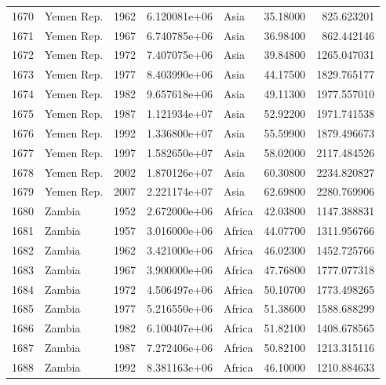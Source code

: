 \documentclass[
  letterpaper,
  DIV=11,
  numbers=noendperiod]{scrreprt}
\begin{document}
\begin{tabular}{llrrlrr}
1670 &                Yemen Rep. &  1962 &  6.120081e+06 &      Asia &  35.18000 &     825.623201 \\
1671 &                Yemen Rep. &  1967 &  6.740785e+06 &      Asia &  36.98400 &     862.442146 \\
1672 &                Yemen Rep. &  1972 &  7.407075e+06 &      Asia &  39.84800 &    1265.047031 \\
1673 &                Yemen Rep. &  1977 &  8.403990e+06 &      Asia &  44.17500 &    1829.765177 \\
1674 &                Yemen Rep. &  1982 &  9.657618e+06 &      Asia &  49.11300 &    1977.557010 \\
1675 &                Yemen Rep. &  1987 &  1.121934e+07 &      Asia &  52.92200 &    1971.741538 \\
1676 &                Yemen Rep. &  1992 &  1.336800e+07 &      Asia &  55.59900 &    1879.496673 \\
1677 &                Yemen Rep. &  1997 &  1.582650e+07 &      Asia &  58.02000 &    2117.484526 \\
1678 &                Yemen Rep. &  2002 &  1.870126e+07 &      Asia &  60.30800 &    2234.820827 \\
1679 &                Yemen Rep. &  2007 &  2.221174e+07 &      Asia &  62.69800 &    2280.769906 \\
1680 &                    Zambia &  1952 &  2.672000e+06 &    Africa &  42.03800 &    1147.388831 \\
1681 &                    Zambia &  1957 &  3.016000e+06 &    Africa &  44.07700 &    1311.956766 \\
1682 &                    Zambia &  1962 &  3.421000e+06 &    Africa &  46.02300 &    1452.725766 \\
1683 &                    Zambia &  1967 &  3.900000e+06 &    Africa &  47.76800 &    1777.077318 \\
1684 &                    Zambia &  1972 &  4.506497e+06 &    Africa &  50.10700 &    1773.498265 \\
1685 &                    Zambia &  1977 &  5.216550e+06 &    Africa &  51.38600 &    1588.688299 \\
1686 &                    Zambia &  1982 &  6.100407e+06 &    Africa &  51.82100 &    1408.678565 \\
1687 &                    Zambia &  1987 &  7.272406e+06 &    Africa &  50.82100 &    1213.315116 \\
1688 &                    Zambia &  1992 &  8.381163e+06 &    Africa &  46.10000 &    1210.884633 \\

\end{tabular}
\end{document}
